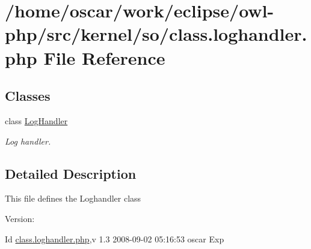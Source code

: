 \hypertarget{class_8loghandler_8php}{
\section{/home/oscar/work/eclipse/owl-php/src/kernel/so/class.loghandler.php File Reference}
\label{class_8loghandler_8php}
}
\subsection*{Classes}
\begin{CompactItemize}
\item 
class \hyperlink{classLogHandler}{LogHandler}
\begin{CompactList}\small\item\em Log handler. \item\end{CompactList}\end{CompactItemize}


\subsection{Detailed Description}
This file defines the Loghandler class \begin{Desc}
\item[Version:]\end{Desc}
\begin{Desc}
\item[Id]\hyperlink{class_8loghandler_8php}{class.loghandler.php},v 1.3 2008-09-02 05:16:53 oscar Exp \end{Desc}
